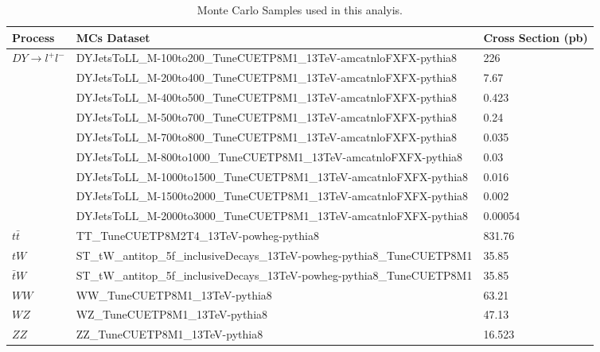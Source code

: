\documentclass[
10pt, %
a4paper, %
oneside, %
headinclude,footinclude, %
BCOR5mm, %
]{scrartcl}
\begin{document}
\begin{table}[htp]
\centering
\label{tab:mcsets}
 \caption{ Monte Carlo Samples used in this analyis. }
\begin{adjustbox}{width=1\textwidth}
 \begin{tabular}{||l l l ||} 
 \hline
 \textbf{Process} & \textbf{MCs Dataset} & \textbf{Cross Section (pb)} \\ [0.5ex] 
 \hline\hline
 $DY \rightarrow l^+ l^-$ & {\small DYJetsToLL\_M-100to200\_TuneCUETP8M1\_13TeV-amcatnloFXFX-pythia8} & 226 \\ 
                          & {\small DYJetsToLL\_M-200to400\_TuneCUETP8M1\_13TeV-amcatnloFXFX-pythia8}   &   7.67   \\  
                          & {\small DYJetsToLL\_M-400to500\_TuneCUETP8M1\_13TeV-amcatnloFXFX-pythia8}    &   0.423  \\
                          & {\small DYJetsToLL\_M-500to700\_TuneCUETP8M1\_13TeV-amcatnloFXFX-pythia8}    &   0.24   \\ 
                          & {\small DYJetsToLL\_M-700to800\_TuneCUETP8M1\_13TeV-amcatnloFXFX-pythia8}    &   0.035 \\ 
                          & {\small DYJetsToLL\_M-800to1000\_TuneCUETP8M1\_13TeV-amcatnloFXFX-pythia8}   &   0.03  \\ 
                          & {\small DYJetsToLL\_M-1000to1500\_TuneCUETP8M1\_13TeV-amcatnloFXFX-pythia8}  &   0.016 \\ 
                          & {\small DYJetsToLL\_M-1500to2000\_TuneCUETP8M1\_13TeV-amcatnloFXFX-pythia8}  &   0.002 \\ 
                          & {\small DYJetsToLL\_M-2000to3000\_TuneCUETP8M1\_13TeV-amcatnloFXFX-pythia8}  &   0.00054\\
 \hline
 $t \bar{t}$              & TT\_TuneCUETP8M2T4\_13TeV-powheg-pythia8  & 831.76\\ 
 \hline
 $tW$                     & ST\_tW\_antitop\_5f\_inclusiveDecays\_13TeV-powheg-pythia8\_TuneCUETP8M1   & 35.85\\
 $\bar{t}W$               & ST\_tW\_antitop\_5f\_inclusiveDecays\_13TeV-powheg-pythia8\_TuneCUETP8M1   & 35.85\\
 \hline
 $WW$                     & WW\_TuneCUETP8M1\_13TeV-pythia8 & 63.21 \\
 $WZ$                     & WZ\_TuneCUETP8M1\_13TeV-pythia8 & 47.13 \\
 $ZZ$                     & ZZ\_TuneCUETP8M1\_13TeV-pythia8 & 16.523 \\ [1ex]

 \hline \hline
\end{tabular}
\end{adjustbox}
\end{table}
\end{document}
